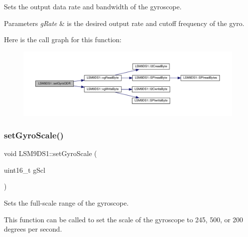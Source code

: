 Sets the output data rate and bandwidth of the gyroscope. 


\begin{DoxyParams}{Parameters}
{\em g\+Rate} & is the desired output rate and cutoff frequency of the gyro. \\
\hline
\end{DoxyParams}
Here is the call graph for this function\+:
\nopagebreak
\begin{figure}[H]
\begin{center}
\leavevmode
\includegraphics[width=350pt]{classLSM9DS1_ab8fc33c8da4fc5c379e880ff57d331fa_cgraph}
\end{center}
\end{figure}
\mbox{\label{classLSM9DS1_a115d304ebcdc8c701f3e5a5d397250aa}} 
\subsubsection{\texorpdfstring{set\+Gyro\+Scale()}{setGyroScale()}}
{\footnotesize\ttfamily void L\+S\+M9\+D\+S1\+::set\+Gyro\+Scale (\begin{DoxyParamCaption}\item[{uint16\+\_\+t}]{g\+Scl }\end{DoxyParamCaption})}



Sets the full-\/scale range of the gyroscope. 

This function can be called to set the scale of the gyroscope to 245, 500, or 200 degrees per second.


